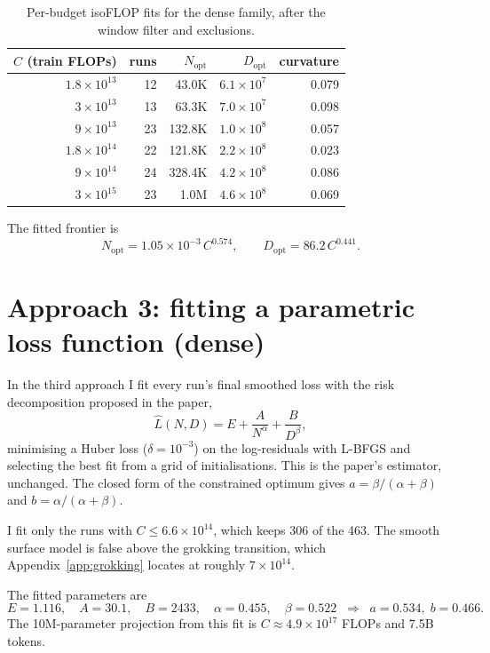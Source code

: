 \documentclass[10pt]{article}
\newcommand{\Nopt}{N_{\mathrm{opt}}}
\newcommand{\Dopt}{D_{\mathrm{opt}}}
\newcommand{\e}[1]{\times 10^{#1}}
\begin{document}
\begin{table}[h]
\centering
\small
\begin{tabular}{rrrrr}
\toprule
$C$ (train FLOPs) & runs & $\Nopt$ & $\Dopt$ & curvature \\
\midrule
$1.8\e{13}$ & 12 & 43.0K & $6.1\e{7}$ & 0.079 \\
$3\e{13}$   & 13 & 63.3K & $7.0\e{7}$ & 0.098 \\
$9\e{13}$   & 23 & 132.8K & $1.0\e{8}$ & 0.057 \\
$1.8\e{14}$ & 22 & 121.8K & $2.2\e{8}$ & 0.023 \\
$9\e{14}$   & 24 & 328.4K & $4.2\e{8}$ & 0.086 \\
$3\e{15}$   & 23 & 1.0M  & $4.6\e{8}$ & 0.069 \\
\bottomrule
\end{tabular}
\caption{Per-budget isoFLOP fits for the dense family, after the window
filter and exclusions.}
\label{tab:a2dense}
\end{table}

The fitted frontier is
\begin{equation}
  \Nopt = 1.05\e{-3}\, C^{0.574}, \qquad
  \Dopt = 86.2\, C^{0.441}.
\end{equation}

\section{Approach 3: fitting a parametric loss function (dense)}

In the third approach I fit every run's final smoothed loss with the risk
decomposition proposed in the paper,
\begin{equation}
  \hat L(N, D) = E + \frac{A}{N^{\alpha}} + \frac{B}{D^{\beta}},
\end{equation}
minimising a Huber loss ($\delta = 10^{-3}$) on the log-residuals with
L-BFGS and selecting the best fit from a grid of initialisations. This is
the paper's estimator, unchanged. The closed form of the constrained optimum
gives $a = \beta/(\alpha+\beta)$ and $b = \alpha/(\alpha+\beta)$.

I fit only the runs with $C \le 6.6\e{14}$, which keeps 306 of the 463. The
smooth surface model is false above the grokking transition, which
Appendix~\ref{app:grokking} locates at roughly $7\e{14}$.

The fitted parameters are
\begin{equation}
  E = 1.116, \quad A = 30.1, \quad B = 2433, \quad
  \alpha = 0.455, \quad \beta = 0.522
  \;\;\Rightarrow\;\; a = 0.534, \; b = 0.466.
\end{equation}
The 10M-parameter projection from this fit is $C \approx 4.9\e{17}$ FLOPs
and 7.5B tokens.
\end{document}
